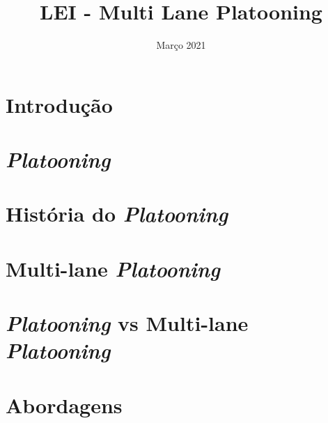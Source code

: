\documentclass{article}
\title{LEI - Multi Lane Platooning}
\author{}
\date{Março 2021}
\begin{document}
\maketitle
\newpage
\section{Introdução}

\newpage

\section{\textit{Platooning}}

\newpage

\section{História do \textit{Platooning}}

\newpage

\section{Multi-lane \textit{Platooning}}

\newpage

\section{\textit{Platooning} vs Multi-lane \textit{Platooning}}

\newpage

\section{Abordagens}

\newpage
\end{document}
